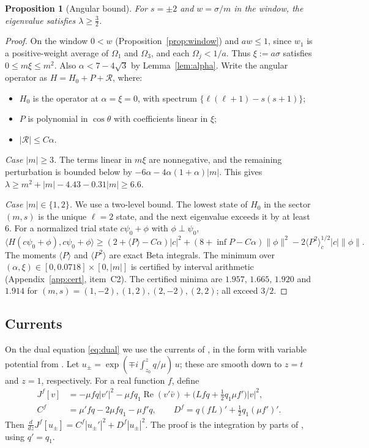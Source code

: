 \documentclass[11pt]{amsart}
\newtheorem{proposition}[theorem]{Proposition}
\theoremstyle{definition}
\theoremstyle{remark}
\numberwithin{equation}{section}
\renewcommand{\Re}{\operatorname{Re}}
\begin{document}
\begin{proposition}[Angular bound]\label{prop:angular}
For $s=\pm2$ and $w=\sigma/m$ in the window, the eigenvalue satisfies $\lambda\ge\frac32$.
\end{proposition}

\begin{proof}
On the window $0<w$ (Proposition~\ref{prop:window}) and $aw\le1$, since $w_1$ is a positive-weight average of
$\Omega_1$ and $\Omega_3$, and each $\Omega_j<1/a$. Thus $\xi:=a\sigma$ satisfies $0\le m\xi\le m^2$. Also
$\alpha<7-4\sqrt3$ by Lemma~\ref{lem:alpha}. Write the angular operator as $H=H_0+P+\mathcal R$, where:
\begin{itemize}
\item $H_0$ is the operator at $\alpha=\xi=0$, with spectrum $\{\ell(\ell+1)-s(s+1)\}$;
\item $P$ is polynomial in $\cos\theta$ with coefficients linear in $\xi$;
\item $|\mathcal R|\le C\alpha$.
\end{itemize}

\emph{Case $|m|\ge3$.} The terms linear in $m\xi$ are nonnegative, and the remaining perturbation is bounded below by
$-6\alpha-4\alpha(1+\alpha)|m|$. This gives $\lambda\ge m^2+|m|-4.43-0.31|m|\ge6.6$.

\emph{Case $|m|\in\{1,2\}$.} We use a two-level bound. The lowest state of $H_0$ in the sector $(m,s)$ is the unique
$\ell=2$ state, and the next eigenvalue exceeds it by at least $6$. For a normalized trial state
$c\psi_0+\phi$ with $\phi\perp\psi_0$,
\[
\langle H(c\psi_0+\phi),c\psi_0+\phi\rangle\ge(2+\langle P\rangle-C\alpha)|c|^2+(8+\inf P-C\alpha)\|\phi\|^2
-2\langle P^2\rangle_c^{1/2}|c|\|\phi\|.
\]
The moments $\langle P\rangle$ and $\langle P^2\rangle$ are exact Beta integrals. The minimum over
$(\alpha,\xi)\in[0,0.0718]\times[0,|m|]$ is certified by interval arithmetic (Appendix~\ref{app:cert}, item~C2). The
certified minima are $1.957$, $1.665$, $1.920$ and $1.914$ for $(m,s)=(1,-2),(1,2),(2,-2),(2,2)$; all exceed $3/2$.
\end{proof}

\subsection{Currents}
On the dual equation \eqref{eq:dual} we use the currents of \cite[Lemma~4.1]{Hin26}, in the form with variable
potential from \cite[\S7]{Hin26}. Let $u_\pm=\exp(\mp i\int_{z_0}^zq/\mu)\,u$; these are smooth down to $z=t$ and
$z=1$, respectively. For a real function $f$, define
\begin{align*}
J^f[v]&=-\mu fq|v'|^2-\mu fq_1\Re(v'\bar v)+\big(Lfq+\tfrac12q_1\mu f'\big)|v|^2,\\
C^f&=\mu'fq-2\mu fq_1-\mu f'q,\qquad D^f=q(fL)'+\tfrac12q_1(\mu f')'.
\end{align*}
Then $\frac{d}{dz}J^f[u_\pm]=C^f|u_\pm'|^2+D^f|u_\pm|^2$. The proof is the integration by parts of
\cite[Lemma~4.1]{Hin26}, using $q'=q_1$.
\end{document}
